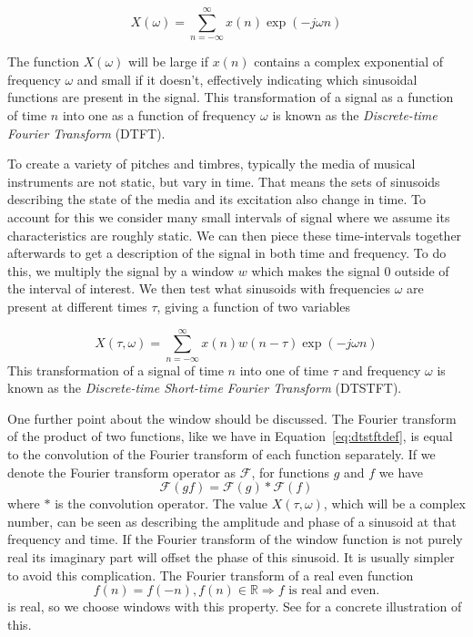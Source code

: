 \[
    X(\omega) = \sum_{n=-\infty}^{\infty} x(n) \exp(-j \omega n)
\]

The function $X(\omega)$ will be large if $x(n)$ contains a complex exponential of
frequency $\omega$ and small if it doesn't, effectively indicating which
sinusoidal functions are present in the signal. This transformation of a signal
as a function of time $n$ into one as a function of frequency $\omega$ is known
as the \textit{Discrete-time Fourier Transform} (DTFT). 

To create a variety of pitches and timbres, typically the media of musical
instruments are not static, but vary in time. That means the sets of sinusoids
describing the state of the media and its excitation also change in time. To
account for this we consider many small intervals of signal where we assume its
characteristics are roughly static. We can then piece these time-intervals
together afterwards to get a description of the signal in both time and
frequency. To do this, we multiply the signal by a window $w$ which makes the signal
0 outside of the interval of interest. We then test what sinusoids with
frequencies $\omega$ are present at different times $\tau$, giving a function of
two variables

\begin{equation}
    \label{eq:dtstftdef}
    X(\tau,\omega) = \sum_{n=-\infty}^{\infty} x(n) w(n - \tau) \exp(-j \omega n)
\end{equation}
This transformation of a signal of time $n$ into one of time $\tau$ and
frequency $\omega$ is known as the \textit{Discrete-time Short-time Fourier
Transform} (DTSTFT).

One further point about the window should be discussed. The Fourier transform of
the product of two functions, like we have in Equation~\ref{eq:dtstftdef}, is
equal to the convolution of the Fourier transform of each function separately.
If we denote the Fourier transform operator as $\mathcal{F}$, for functions $g$
and $f$ we have
\[
    \mathcal{F}(gf) = \mathcal{F}(g)\ast\mathcal{F}(f)
\]
where $\ast$ is the convolution operator. The value $X(\tau,\omega)$, which will
be a complex number, can be seen
as describing the amplitude and phase of a sinusoid at that frequency and time.
If the Fourier transform of the window function is not purely real its imaginary
part will offset the phase of this sinusoid. It is usually simpler to avoid this
complication. The Fourier transform of a real even function
\[
    f(n) = f(-n), f(n) \in \mathbb{R} \Rightarrow f\text{ is real and even.}
\]
is real, so we choose windows with this property. See
\cite[p.~52]{harris1978use} for a concrete illustration of this.

